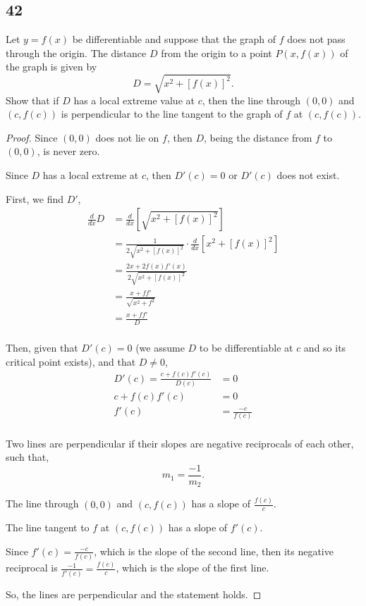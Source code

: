 \documentclass[../hw4.tex]{subfiles}
\begin{document}
\subsection*{42}
Let $y = f(x)$ be differentiable and suppose that the graph of $f$ does not pass through the origin. The distance $D$ from the origin to a point $P(x,f(x))$ of the graph is given by
\[D = \sqrt{x^2+{[f(x)]}^2}.\]
Show that if $D$ has a local extreme value at $c$, then the line through $(0,0)$ and $(c,f(c))$ is perpendicular to the line tangent to the graph of $f$ at $(c,f(c))$.

\begin{proof}
    Since $(0,0)$ does not lie on $f$, then $D$, being the distance from $f$ to $(0,0)$, is never zero.

    Since $D$ has a local extreme at $c$, then $D'(c) = 0$ or $D'(c)$ does not exist.

    First, we find $D'$,
    \begin{align*}
        \frac{d}{dx} D &= \frac{d}{dx} \left[ \sqrt{x^2+{[f(x)]}^2} \right] \\
        &= \frac{1}{2\sqrt{x^2+{[f(x)]}^2}} \cdot \frac{d}{dx} \left[ x^2+{[f(x)]}^2 \right] \\
        &= \frac{2x+2f(x)f'(x)}{2\sqrt{x^2+{[f(x)]}^2}} \\
        &= \frac{x+ff'}{\sqrt{x^2+f^2}} \\
        &= \frac{x+ff'}{D} \\
    \end{align*}

    Then, given that $D'(c)=0$ (we assume $D$ to be differentiable at $c$ and so its critical point exists), and that $D\neq0$,
    \begin{align*}
        D'(c) = \frac{c+f(c)f'(c)}{D(c)} &= 0 \\
        c+f(c)f'(c) &= 0 \\
        f'(c) &= \frac{-c}{f(c)} \\
    \end{align*}

    Two lines are perpendicular if their slopes are negative reciprocals of each other, such that,
    \[m_1 = \frac{-1}{m_2}.\]

    The line through $(0,0)$ and $(c,f(c))$ has a slope of $\frac{f(c)}{c}$.

    The line tangent to $f$ at $(c,f(c))$ has a slope of $f'(c)$.

    Since $f'(c) = \frac{-c}{f(c)}$, which is the slope of the second line, then its negative reciprocal is $\frac{-1}{f'(c)} = \frac{f(c)}{c}$, which is the slope of the first line.

    So, the lines are perpendicular and the statement holds. 

\end{proof}
\end{document}
